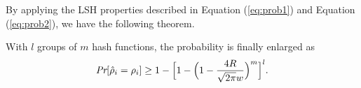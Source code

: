 By applying the LSH properties described in Equation (\ref{eq:prob1}) and Equation (\ref{eq:prob2}), we have the following theorem.

\begin{theorem}
\label{the:prob3}
With $l$ groups of $m$ hash functions, the probability is finally enlarged as
\begin{equation}\label{eq:lm:prob3}
\emph{Pr}[\hat\rho_i=\rho_i]\geq 1-\Big[1-\Big(1-\frac{4R}{\sqrt{2\pi}w}\Big)^m\Big]^l.
\end{equation}
\end{theorem}

\begin{comment}
\begin{proof}
After applying $l$ groups of $m$ hash functions, we will obtain $l$ $\hat\rho_i^g$ values $(1\leq g\leq l)$. According to the definition of $\rho_i$, we have
$\hat\rho_i^g \leq \max_{g}\hat\rho_i^g \leq \hat\rho_i$. If
$\max_{g}\hat\rho_i^g \neq \rho_i$, then
$\hat\rho_i^g\neq \rho_i$ for all $1\leq g\leq l$.

From Lemma 1, under a single hash function the probability that $p_i$ and all its $R$-length neighbors are hashed to the same bucket is at least $1-\frac{4R}{\sqrt{2\pi}w}$. With a group of $m$ LSH functions $G=(h_1,h_2,\ldots,h_{m})$ applied on each point, only points sharing all the $m$ hash values are placed in the same partition. Suppose $\hat\rho_i^g$ is the approximated density value for a specific hash function group $G_g(p_i)$. Due to the fact that each LSH function is independently and randomly selected, we have:
\begin{equation}\label{eq:probx}
\begin{aligned}
  \text{Pr}[\hat\rho_i^g=\rho_i]=&\text{Pr}\big[G_g(p_i)=G_g(p_{j})|\forall j, ||p_i,p_j||\leq R\big]\\
  =&\prod_{t=1}^{m}\text{Pr}\big[h_t(p_i)=h_t(p_j)|\forall j, ||p_i,p_j||\leq R\big]\\
  \geq &\Big(1-\frac{4R}{\sqrt{2\pi}w}\Big)^m\notag
\end{aligned}
\end{equation}
Further, since the $l$ groups of hash functions
$G_g(1\leq g\leq l)$ is independently and randomly generated,
we have the following:
\begin{equation}\label{eq:prob3}
\begin{aligned}
  \text{Pr}[\hat\rho_i=\rho_i]=&1-\prod_{g=1}^l\Big(1-\text{Pr}\Big[\hat\rho_i^g=\rho_i\Big]\Big)\\
  \geq &1-\Big[1-\Big(1-\frac{4R}{\sqrt{2\pi}w}\Big)^m\Big]^l\notag
\end{aligned}
\end{equation}
\end{proof}
\end{comment}

